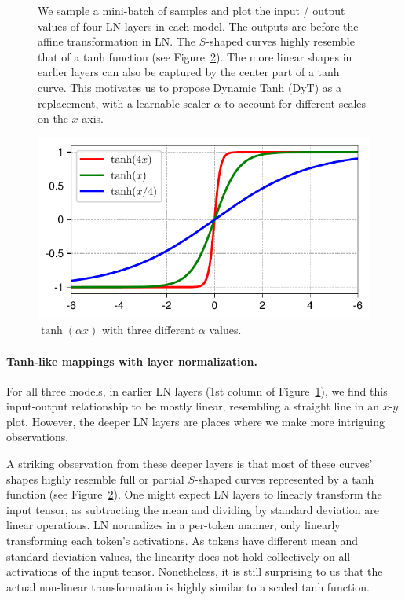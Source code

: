 \begin{figure}[t]
{We sample a mini-batch of samples and plot the input / output values of four LN layers in each model. The outputs are before the affine transformation in LN. The $S$-shaped curves highly resemble that of a tanh function (see Figure~\ref{figure:tanh_plot}). The more linear shapes in earlier layers can also be captured by the center part of a tanh curve. This motivates us to propose Dynamic Tanh (DyT) as a replacement, with a learnable scaler $\alpha$ to account for different scales on the $x$ axis.}
\label{figure:input-output}
\end{figure}

\begin{figure}
\centering
\vspace*{-0.6cm}
\hspace*{-0.8cm}
\includegraphics[width=1.15\linewidth]{figures/tanh_plot.pdf}
\caption{$\tanh(\alpha x)$ with three different $\alpha$ values.}
\label{figure:tanh_plot}
\end{figure}

\paragraph{Tanh-like mappings with layer normalization.} For all three models, in earlier LN layers (1st column of Figure~\ref{figure:input-output}), we find this input-output relationship to be mostly linear, resembling a straight line in an $x$-$y$ plot. However, the deeper LN layers are places where we make more intriguing observations.

A striking observation from these deeper layers is that most of these curves' shapes highly resemble full or partial $S$-shaped curves represented by a tanh function (see Figure~\ref{figure:tanh_plot}). One might expect LN layers to linearly transform the input tensor, as subtracting the mean and dividing by standard deviation are linear operations. LN normalizes in a per-token manner, only linearly transforming each token's activations. As tokens have different mean and standard deviation values, the linearity does not hold collectively on all activations of the input tensor.
Nonetheless, it is still surprising to us that the actual non-linear transformation is highly similar to a scaled tanh function.


